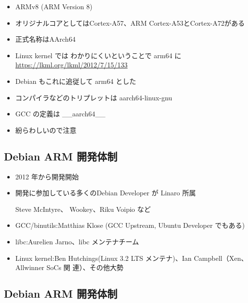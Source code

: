 \documentclass[mingoth,a4paper]{jsarticle}
\begin{document}
\begin{minipage}{0.7\hsize}
\begin{itemize}
\item ARMv8 (ARM Version 8)
\item オリジナルコアとしてはCortex-A57、ARM Cortex-A53とCortex-A72がある
\item 正式名称はAArch64
\item Linux kernel では わかりにくいということで arm64 に\\
\url{https://lkml.org/lkml/2012/7/15/133}
\item Debian もこれに追従して arm64 とした
\item コンパイラなどのトリプレットは aarch64-linux-gnu 
\item GCC の定義は \_\_aarch64\_\_ 
\item 紛らわしいので注意
\end{itemize}
\end{minipage}
\begin{minipage}{0.25\hsize}
\end{minipage}

  \subsection{Debian ARM 開発体制}

  \begin{itemize}
  \item 2012 年から開発開始
  \item 開発に参加している多くのDebian Developer が Linaro 所属

   Steve McIntyre、 Wookey、Riku Voipio など

  \item GCC/binutils:Matthias Klose (GCC Upstream, Ubuntu Developer でもある)
  \item libc:Aurelien Jarno、libc メンテナチーム
  \item Linux kernel:Ben Hutchings(Linux 3.2 LTS メンテナ)、Ian Campbell（Xen、Allwinner SoCs 関
連）、その他大勢


  \end{itemize}

  \subsection{Debian ARM 開発体制}
\end{document}
